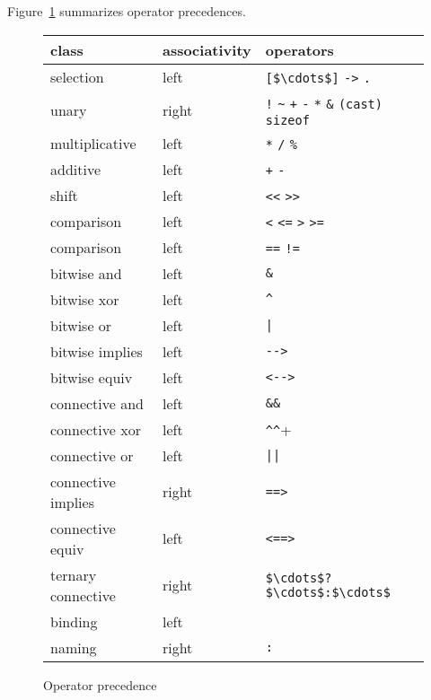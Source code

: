 Figure~\ref{fig:precedence} summarizes operator precedences.
\begin{figure}[htbp]
  \begin{center}
    \begin{tabular}{|l|l|l|}
      \hline
      class 	& associativity & operators \\
      \hline
      selection & left & \lstinline|[$\cdots$]| \lstinline|->| \lstinline|.| \\
      unary 	& right & \lstinline|!| \lstinline|~| \lstinline|+|
      \lstinline|-| \lstinline|*| \lstinline|&| \lstinline|(cast)|
      \lstinline|sizeof| \\
      multiplicative & left & \lstinline|*| \lstinline|/|  \lstinline|%| \\
      additive & left & \lstinline|+| \lstinline|-| \\
      shift 	& left & \lstinline|<<| \lstinline|>>| \\
      comparison & left & \lstinline|<| \lstinline|<=| \lstinline|>| \lstinline|>=| \\
      comparison & left & \lstinline|==| \lstinline|!=| \\
      bitwise and & left & \lstinline|&| \\
      bitwise xor & left & \lstinline|^| \\
      bitwise or & left & \lstinline+|+ \\
      bitwise implies & left & \lstinline+-->+ \\
      bitwise equiv & left & \lstinline+<-->+ \\
      connective and     & left & \lstinline|&&| \\
      connective xor & left & \lstinline+^^+ \\
      connective or & left & \lstinline+||+ \\
      connective implies & right & \lstinline|==>| \\
      connective equiv & left & \lstinline|<==>| \\
      ternary connective & right & \lstinline|$\cdots$?$\cdots$:$\cdots$| \\
      binding & left & \Forall{} \Exists{} \Let{} \\
      naming & right & \lstinline|:| \\
      \hline
    \end{tabular}
  \end{center}
  \caption{Operator precedence}
\label{fig:precedence}
\end{figure}


